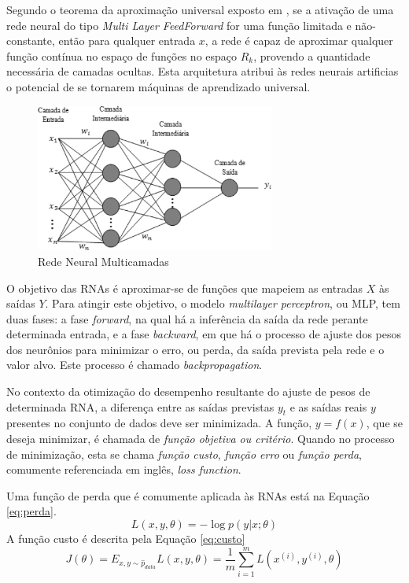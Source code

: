 Segundo o teorema da aproximação universal exposto em \cite{hornik1991approximation}, se a ativação de uma rede neural do tipo \emph{Multi Layer FeedForward} for uma função limitada e não-constante, então para qualquer entrada $x$, a rede é capaz de aproximar qualquer função contínua no espaço de funções no espaço $R_k$, provendo a quantidade necessária de camadas ocultas. Esta arquitetura atribui às redes neurais artificias o potencial de se tornarem máquinas de aprendizado universal.


\begin{figure}[ht]
	\centering
	\includegraphics[width=0.7\textwidth]{img/mlprna.jpg}
	\caption{Rede Neural Multicamadas}
	\label{fig:mlp}
\end{figure}

O objetivo das RNAs é aproximar-se de funções que mapeiem as entradas $X$ às saídas $Y$. Para atingir este objetivo, o modelo \emph{multilayer perceptron}, ou MLP, tem duas fases: a fase \emph{forward}, na qual há a inferência da saída da rede perante determinada entrada, e a fase \emph{backward}, em que há o processo de ajuste dos pesos dos neurônios para minimizar o erro, ou perda, da saída prevista pela rede e o valor alvo. Este processo é chamado \emph{backpropagation}.

No contexto da otimização do desempenho resultante do ajuste de pesos de determinada RNA, a diferença entre as saídas previstas $y_t$ e as saídas reais $y$ presentes no conjunto de dados deve ser minimizada. A função, $y=f(x)$, que se deseja minimizar, é chamada de \emph{função objetiva ou critério}. Quando no processo de minimização, esta se chama \emph{função custo}, \emph{função erro} ou \emph{função perda}, comumente referenciada em inglês, \emph{loss function}.

Uma função de perda que é comumente aplicada às RNAs está na Equação \ref{eq:perda}.
\begin{equation}\label{eq:perda}
	L(x, y, \theta) = - \log p (y|x;\theta)
\end{equation}
A função custo é descrita pela Equação \ref{eq:custo}
\begin{equation}\label{eq:custo}
	J(\theta) = E_{x,y \sim \hat{p}_{data}} L(x, y, \theta) = \frac{1}{m} \sum_{i=1}^{m} L(x^{(i)}, y^{(i)}, \theta)
\end{equation}

